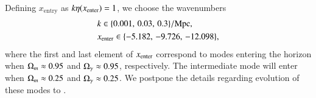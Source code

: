 Defining $x_\mathrm{entry}$ as $k\eta(x_\mathrm{enter})=1$, we choose the wavenumbers
\begin{equation} \label{eq:M3:theory:k_values_for_plotting}
    \begin{split}
        &k\in\{ 0.001,\,0.03,\,0.3 \}/\mathrm{Mpc}, \\
        &x_\mathrm{enter} \in \{ -5.182,\,-9.726,\,-12.098 \},
    \end{split}
\end{equation}
where the first and last element of $x_\mathrm{enter}$ correspond to modes entering the horizon when $\Omega_{m}\approx0.95$ and $\Omega_{\gamma}\approx0.95$, respectively. The intermediate mode will enter when $\Omega_{m}\approx0.25$ and $\Omega_{\gamma}\approx0.25$. We postpone the details regarding evolution of these modes to . 

